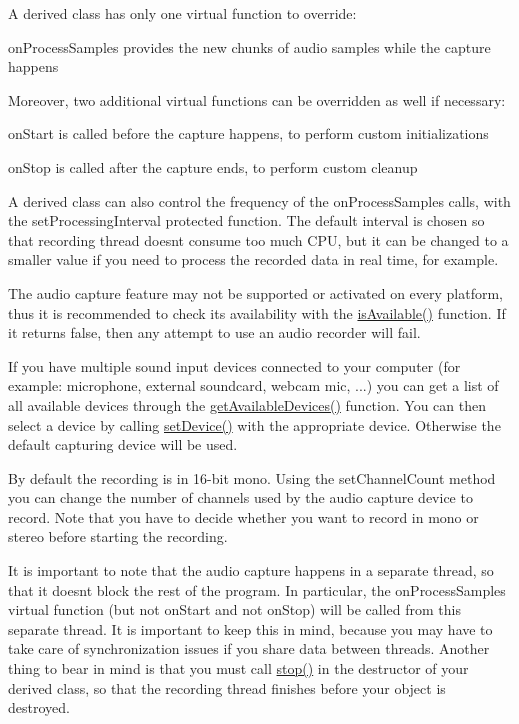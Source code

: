 A derived class has only one virtual function to override\+: \begin{DoxyItemize}
\item on\+Process\+Samples provides the new chunks of audio samples while the capture happens\end{DoxyItemize}
Moreover, two additional virtual functions can be overridden as well if necessary\+: \begin{DoxyItemize}
\item on\+Start is called before the capture happens, to perform custom initializations \item on\+Stop is called after the capture ends, to perform custom cleanup\end{DoxyItemize}
A derived class can also control the frequency of the on\+Process\+Samples calls, with the set\+Processing\+Interval protected function. The default interval is chosen so that recording thread doesn\textquotesingle{}t consume too much C\+PU, but it can be changed to a smaller value if you need to process the recorded data in real time, for example.

The audio capture feature may not be supported or activated on every platform, thus it is recommended to check its availability with the \hyperlink{classsf_1_1_sound_recorder_aab2bd0fee9e48d6cfd449b1cb078ce5a}{is\+Available()} function. If it returns false, then any attempt to use an audio recorder will fail.

If you have multiple sound input devices connected to your computer (for example\+: microphone, external soundcard, webcam mic, ...) you can get a list of all available devices through the \hyperlink{classsf_1_1_sound_recorder_a26198c5c11efcd61f426f326fe314afe}{get\+Available\+Devices()} function. You can then select a device by calling \hyperlink{classsf_1_1_sound_recorder_a8eb3e473292c16e874322815836d3cd3}{set\+Device()} with the appropriate device. Otherwise the default capturing device will be used.

By default the recording is in 16-\/bit mono. Using the set\+Channel\+Count method you can change the number of channels used by the audio capture device to record. Note that you have to decide whether you want to record in mono or stereo before starting the recording.

It is important to note that the audio capture happens in a separate thread, so that it doesn\textquotesingle{}t block the rest of the program. In particular, the on\+Process\+Samples virtual function (but not on\+Start and not on\+Stop) will be called from this separate thread. It is important to keep this in mind, because you may have to take care of synchronization issues if you share data between threads. Another thing to bear in mind is that you must call \hyperlink{classsf_1_1_sound_recorder_a8d9c8346aa9aa409cfed4a1101159c4c}{stop()} in the destructor of your derived class, so that the recording thread finishes before your object is destroyed.

